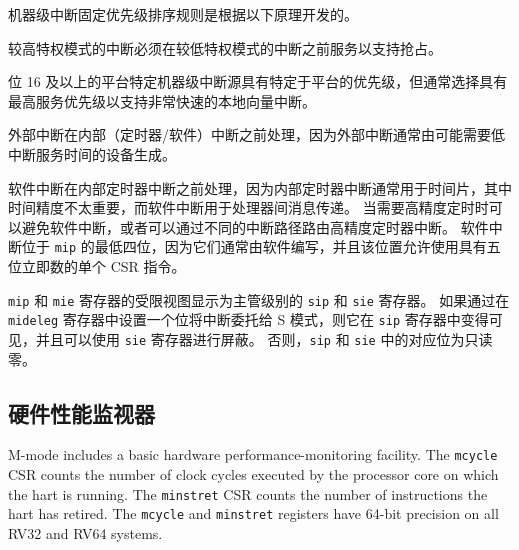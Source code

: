 \begin{commentary}

机器级中断固定优先级排序规则是根据以下原理开发的。

较高特权模式的中断必须在较低特权模式的中断之前服务以支持抢占。

位 16 及以上的平台特定机器级中断源具有特定于平台的优先级，但通常选择具有最高服务优先级以支持非常快速的本地向量中断。

外部中断在内部（定时器/软件）中断之前处理，因为外部中断通常由可能需要低中断服务时间的设备生成。

软件中断在内部定时器中断之前处理，因为内部定时器中断通常用于时间片，其中时间精度不太重要，而软件中断用于处理器间消息传递。 当需要高精度定时时可以避免软件中断，或者可以通过不同的中断路径路由高精度定时器中断。 软件中断位于 {\tt mip} 的最低四位，因为它们通常由软件编写，并且该位置允许使用具有五位立即数的单个 CSR 指令。
\end{commentary}

\iffalse
Restricted views of the {\tt mip} and {\tt mie} registers appear as
the {\tt sip} and {\tt sie} registers for supervisor level.
If an interrupt is delegated to
S-mode by setting a bit in the {\tt mideleg} register,
it becomes visible in the {\tt sip} register and is maskable
using the {\tt sie} register.  Otherwise, the corresponding
bits in {\tt sip} and {\tt sie} are read-only
zero.
\fi

{\tt mip} 和 {\tt mie} 寄存器的受限视图显示为主管级别的 {\tt sip} 和 {\tt sie} 寄存器。 如果通过在 {\tt mideleg} 寄存器中设置一个位将中断委托给 S 模式，则它在 {\tt sip} 寄存器中变得可见，并且可以使用 {\tt sie} 寄存器进行屏蔽。 否则，{\tt sip} 和 {\tt sie} 中的对应位为只读零。

\subsection{硬件性能监视器}

\iffalse
M-mode includes a basic hardware performance-monitoring facility.  The
{\tt mcycle} CSR counts the number of clock cycles executed by the
processor core on which the hart is running.
The {\tt minstret} CSR counts the number of instructions the hart has
retired.  The {\tt mcycle} and {\tt minstret} registers have 64-bit
precision on all RV32 and RV64 systems.

